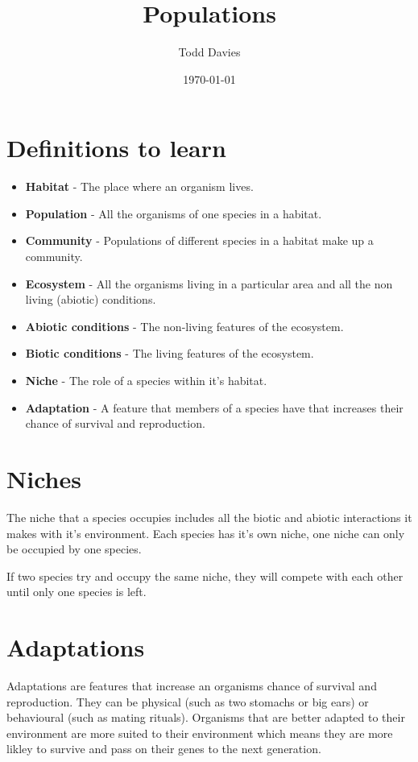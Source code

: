 \documentclass{article}
\title{Populations}
\author{Todd Davies}
\date{\today}
\begin{document}
\lhead{\today}

\maketitle

\section*{Definitions to learn}
\thispagestyle{empty}
\begin{itemize}
	\item \textbf{Habitat} - The place where an organism lives.
	\item \textbf{Population} - All the organisms of one species in a habitat.
	\item \textbf{Community} - Populations of different species in a habitat
	make up a community.
	\item \textbf{Ecosystem} - All the organisms living in a particular area and
	all the non living (abiotic) conditions.
	\item \textbf{Abiotic conditions} - The non-living features of the
	ecosystem.
	\item \textbf{Biotic conditions} - The living features of the ecosystem.
	\item \textbf{Niche} - The role of a species within it's habitat.
	\item \textbf{Adaptation} - A feature that members of a species have that
	increases their chance of survival and reproduction.
\end{itemize}

\section*{Niches}
The niche that a species occupies includes all the biotic and abiotic
interactions it makes with it's environment. Each species has it's own niche,
one niche can only be occupied by one species.

If two species try and occupy the same niche, they will compete with each
other until only one species is left.

\section*{Adaptations}
Adaptations are features that increase an organisms chance of survival and
reproduction. They can be physical (such as two stomachs or big ears) or
behavioural (such as mating rituals). Organisms that are better adapted to
their environment are more suited to their environment which means they are
more likley to survive and pass on their genes to the next generation.
\end{document}
